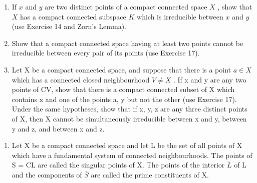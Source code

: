 \begin{enumerate}
\def\labelenumi{\alph{enumi})}
\item
  If \(x\) and \(y\) are two distinct points of a compact connected space \(X\) , show that \(X\) has a compact connected subspace \(K\) which is irreducible between \(x\) and \(y\) (use Exercise 14 and Zorn's Lemma).
\item
  Show that a compact connected space having at least two points cannot be irreducible between every pair of its points (use Exercise 17).
\item
  Let X be a compact connected space, and suppose that there is a point \(a \in X\) which has a connected closed neighbourhood \(V \neq X\) . If x and y are any two points of CV, show that there is a compact connected subset of X which contains x and one of the points a, y but not the other (use Exercise 17). Under the same hypotheses, show that if x, y, z are any three distinct points of X, then X cannot be simultaneously irreducible between x and y, between y and z, and between x and z.
\end{enumerate}

\begin{enumerate}
\def\labelenumi{\arabic{enumi})}
\setcounter{enumi}{19}
\tightlist
\item
  Let X be a compact connected space and let L be the set of all points of X which have a fundamental system of connected neighbourhoods. The points of S = CL are called the singular points of X. The points of the interior \(\dot{L}\) of L and the components of \(\bar{S}\) are called the prime constituents of X.
\end{enumerate}

